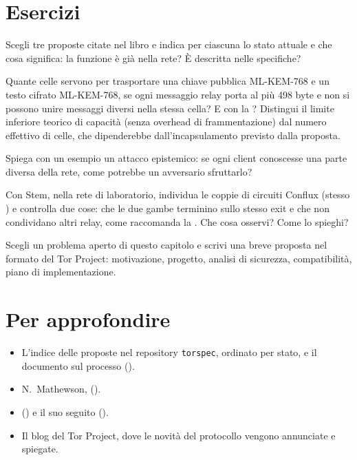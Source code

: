 \section*{Esercizi}

\begin{esercizio}[1]\label{es:31-stato}
Scegli tre proposte citate nel libro e indica per ciascuna lo stato attuale e che cosa significa: la funzione è già nella rete? È descritta nelle specifiche?
\end{esercizio}

\begin{esercizio}[1]\label{es:31-celle}
Quante celle servono per trasportare una chiave pubblica ML-KEM-768 e un testo cifrato ML-KEM-768, se ogni messaggio relay porta al più 498 byte e non si possono unire messaggi diversi nella stessa cella? E con la ? Distingui il limite inferiore teorico di capacità (senza overhead di frammentazione) dal numero effettivo di celle, che dipenderebbe dall'incapsulamento previsto dalla proposta.
\end{esercizio}

\begin{esercizio}[2]\label{es:31-epistemico}
Spiega con un esempio un attacco epistemico: se ogni client conoscesse una parte diversa della rete, come potrebbe un avversario sfruttarlo?
\end{esercizio}

\begin{esercizio}[2]\label{es:31-conflux}
Con Stem, nella rete di laboratorio, individua le coppie di circuiti Conflux (stesso ) e controlla due cose: che le due gambe terminino sullo stesso exit e che non condividano altri relay, come raccomanda la . Che cosa osservi? Come lo spieghi?
\end{esercizio}

\begin{esercizio}[3]\label{es:31-proposta}
Scegli un problema aperto di questo capitolo e scrivi una breve proposta nel formato del Tor Project: motivazione, progetto, analisi di sicurezza, compatibilità, piano di implementazione.
\end{esercizio}

\section*{Per approfondire}
\begin{itemize}
  \item L'indice delle proposte nel repository \texttt{torspec}, ordinato per stato, e il documento sul processo ().
  \item N.~Mathewson,  ().
  \item {} () e il suo seguito ().
  \item Il blog del Tor Project, dove le novità del protocollo vengono annunciate e spiegate.
\end{itemize}
